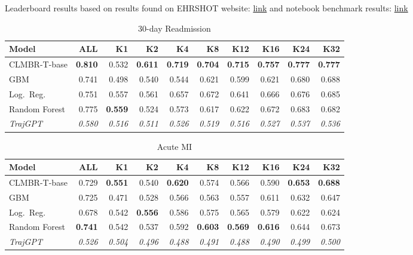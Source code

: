\documentclass{article}
\newcommand{\B}[1]{\textbf{#1}}
\newcommand{\IT}[1]{\textit{#1}}
\begin{document}
\footnotesize

\begin{center} Leaderboard results based on results found on EHRSHOT website: \href{https://som-shahlab.github.io/ehrshot-website/leaderboard/paper/}{link} and notebook benchmark results: \href{https://colab.research.google.com/drive/1_Wy2hev0zJKGPcl0mckvNNAda8icZ_Cj?usp=sharing}{link} \end{center}

\begin{table}[ht]
\centering\caption{30-day Readmission}
\begin{tabular}{l *{9}{r}}
\toprule
\textbf{Model} & \textbf{ALL} & \textbf{K1} & \textbf{K2} & \textbf{K4} & \textbf{K8} & \textbf{K12} & \textbf{K16} & \textbf{K24} & \textbf{K32} \\
\midrule
CLMBR-T-base  & \B{0.810} & 0.532     & \B{0.611} & \B{0.719} & \B{0.704} & \B{0.715} & \B{0.757} & \B{0.777} & \B{0.777} \\
GBM           & 0.741     & 0.498     & 0.540     & 0.544     & 0.621     & 0.599     & 0.621     & 0.680     & 0.688     \\
Log.\ Reg.    & 0.751     & 0.557     & 0.561     & 0.657     & 0.672     & 0.641     & 0.666     & 0.676     & 0.685     \\
Random Forest & 0.775     & \B{0.559} & 0.524     & 0.573     & 0.617     & 0.622     & 0.672     & 0.683     & 0.682     \\
\IT{TrajGPT}  & \IT{0.580} & \IT{0.516} & \IT{0.511} & \IT{0.526} & \IT{0.519} & \IT{0.516} & \IT{0.527} & \IT{0.537} & \IT{0.536} \\
\bottomrule
\end{tabular}
\end{table}

\begin{table}[ht]
\centering\caption{Acute MI}
\begin{tabular}{l *{9}{r}}
\toprule
\textbf{Model} & \textbf{ALL} & \textbf{K1} & \textbf{K2} & \textbf{K4} & \textbf{K8} & \textbf{K12} & \textbf{K16} & \textbf{K24} & \textbf{K32} \\
\midrule
CLMBR-T-base  & 0.729     & \B{0.551} & 0.540     & \B{0.620} & 0.574     & 0.566     & 0.590     & \B{0.653} & \B{0.688} \\
GBM           & 0.725     & 0.471     & 0.528     & 0.566     & 0.563     & 0.557     & 0.611     & 0.632     & 0.647     \\
Log.\ Reg.    & 0.678     & 0.542     & \B{0.556} & 0.586     & 0.575     & 0.565     & 0.579     & 0.622     & 0.624     \\
Random Forest & \B{0.741} & 0.542     & 0.537     & 0.592     & \B{0.603} & \B{0.569} & \B{0.616} & 0.644     & 0.673     \\
\IT{TrajGPT}  & \IT{0.526} & \IT{0.504} & \IT{0.496} & \IT{0.488} & \IT{0.491} & \IT{0.488} & \IT{0.490} & \IT{0.499} & \IT{0.500} \\
\bottomrule
\end{tabular}
\end{table}
\end{document}

